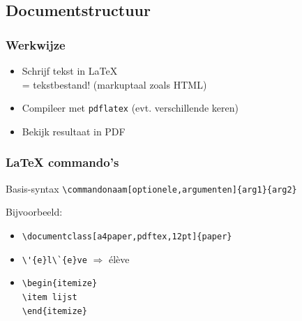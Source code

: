 \documentclass[aspectratio=169]{beamer}
\begin{document}
\subsection{Documentstructuur}

\begin{frame}
  \frametitle{Werkwijze}

  \begin{itemize}
  \item<+-> Schrijf tekst in {\LaTeX}\\
            = tekstbestand! (markuptaal zoals HTML)
  \item<+-> Compileer met \texttt{pdflatex} (evt. verschillende keren)
  \item<+-> Bekijk resultaat in PDF
  \end{itemize}
\end{frame}

\begin{frame}[fragile]
  \frametitle{{\LaTeX} commando's}

  \begin{block}{Basis-syntax}
  \verb|\commandonaam[optionele,argumenten]{arg1}{arg2}|
  \end{block}

  \pause

  Bijvoorbeeld:

  \begin{itemize}
  \item<+-> \verb|\documentclass[a4paper,pdftex,12pt]{paper}|
  \item<+-> \verb|\'{e}l\`{e}ve| $\Rightarrow$ \'el\`eve
  \item<+-> \verb|\begin{itemize}|\\
            \verb|\item lijst|\\
            \verb|\end{itemize}|
  \end{itemize}

\end{frame}
\end{document}
